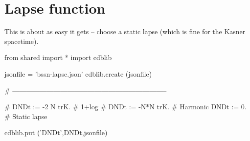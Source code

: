 \documentclass[12pt]{cdblatex}
\begin{document}
\section*{Lapse function}

This is about as easy it gets -- choose a static lapse (which is fine for the Kasner spacetime).

\begin{cadabra}
   from shared import *
   import cdblib

   jsonfile = 'bssn-lapse.json'
   cdblib.create (jsonfile)

   # --------------------------------------------------------------------

   # DNDt := -2 N trK.  # 1+log
   # DNDt := -N*N trK.  # Harmonic
   DNDt := 0.           # Static lapse

   cdblib.put ('DNDt',DNDt,jsonfile)
\end{cadabra}
\end{document}
